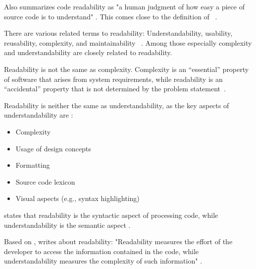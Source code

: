 \documentclass[%
class=scrreprt,
chapterprefix=false,%
open=right,%
twoside=false,%
paper=a4,%
logofile={Logo\_zentral\_farbig\_EN.png},%
thesistype=master,%
UKenglish,%
]{se2thesis}
\theoremstyle{definition}
\begin{document}
	Also \citeauthor{mi2021effectiveness} summarizes code readability as "a human judgment of how easy a piece of
	source code is to understand" \cite{mi2021effectiveness}. This comes close to the definition of \citeauthor{buse2009learning}~\cite{buse2009learning}.
	
	There are various related terms to readability: Understandability, usability, reusability, complexity, and maintainability \cite{tashtoush2013impact}~\cite{tashtoush2013impact}. Among those especially complexity and understandability are closely related to readability.
	
	Readability is not the same as complexity. Complexity is an “essential” property of software that arises
	from system requirements, while readability is an “accidental” property that is not determined by the problem statement~\cite{buse2009learning, brooks1987no}.
	
	Readability is neither the same as understandability, as the key aspects of understandability are \cite{scalabrino2018comprehensive, martin2009clean, wilson2007beautiful, beck2007implementation}:
	\begin{itemize}
		\item Complexity
		\item Usage of design concepts
		\item Formatting
		\item Source code lexicon
		\item Visual aspects (e.g., syntax highlighting)
	\end{itemize}
	
	\citeauthor{posnett2011simpler} states that readability is the syntactic aspect of processing code, while understandability is the semantic aspect \cite{posnett2011simpler}.
	
	Based on \citeauthor{posnett2011simpler}, \citeauthor{scalabrino2018comprehensive} writes about readability: "Readability measures the effort of the developer to access the information contained in the code, while understandability measures the complexity of such information" \cite{scalabrino2018comprehensive, posnett2011simpler}.
	
	
\end{document}
